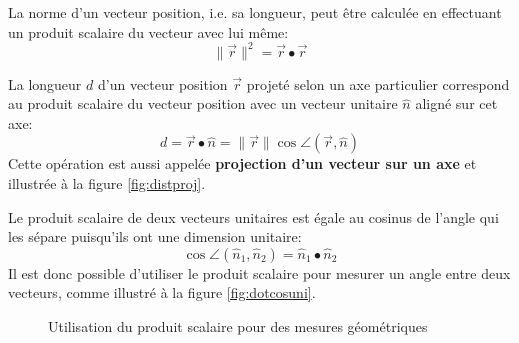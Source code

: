\begin{property}[Norme]
La norme d'un vecteur position, i.e. sa longueur, peut être calculée en effectuant un produit scalaire du vecteur avec lui même:
\begin{equation}
\| \vec{r} \|^2 = \vec{r} \bullet \vec{r} 
\label{eq:dotnorm}
\end{equation} 
\end{property}

\begin{property}[Projection]
La longueur $d$ d'un vecteur position $\vec{r}$ projeté selon un axe particulier correspond au produit scalaire du vecteur position avec un vecteur unitaire $\hat{n}$ aligné sur cet axe:
\begin{equation}
d = \vec{r} \bullet \hat{n} = \| \vec{r} \|  \cos \angle (\vec{r},\hat{n})
\label{eq:vecproj}
\end{equation} 
Cette opération est aussi appelée \textbf{projection d'un vecteur sur un axe} et illustrée à la figure \ref{fig:distproj}. 
\end{property}

\begin{property}[Angle]
Le produit scalaire de deux vecteurs unitaires est égale au cosinus de l'angle qui les sépare puisqu'ils ont une dimension unitaire:
\begin{equation}
\cos \angle (\hat{n}_1,\hat{n}_2) =  \hat{n}_1 \bullet \hat{n}_2
\label{eq:dotangle}
\end{equation} 
Il est donc possible d'utiliser le produit scalaire pour mesurer un angle entre deux vecteurs, comme illustré à la figure \ref{fig:dotcosuni}.  
\end{property}
%
\begin{figure}[htbp]
        \centering
				\hspace{20pt}
        \caption{Utilisation du produit scalaire pour des mesures géométriques}
				\label{fig:utprosca}
\end{figure}

